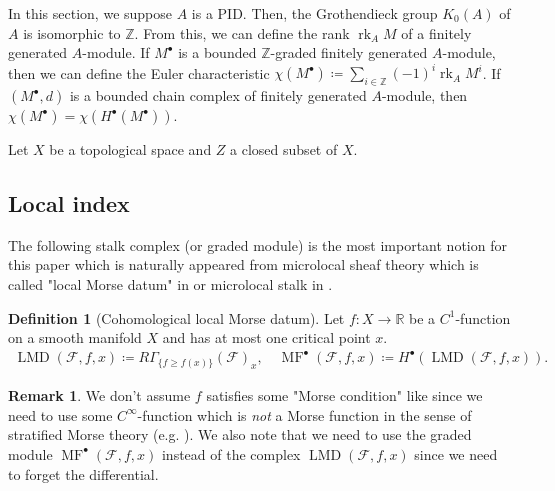\documentclass[a4paper,dvipdfmx,reqno,12pt]{amsart}
\theoremstyle{definition}
\newtheorem{Def}[Thm]{Definition}
\newtheorem{Rmk}[Thm]{Remark}
\newcommand{\deq}{\coloneqq}
\newcommand{\R}{\mathbb{R}}%
\newcommand{\Z}{\mathbb{Z}}%
\newcommand{\mcal}[1]{\mathcal{#1}}%
\newcommand{\opn}[1]{\operatorname{#1}}
\numberwithin{equation}{section}
\begin{document}
In this section, we suppose $A$ is a PID. Then, the Grothendieck 
group $K_0(A)$ of $A$ is isomorphic to $\Z$. From this, 
we can define the rank $\opn{rk}_A M$ of 
a finitely generated $A$-module.
If $M^{\bullet}$ is a bounded $\Z$-graded finitely generated $A$-module,
then we can define the Euler characteristic 
$\chi(M^{\bullet})\deq \sum_{i\in \Z}(-1)^{i}\opn{rk}_A M^{i}$.
If $(M^{\bullet},d)$ is a bounded chain complex of finitely 
generated $A$-module, then 
$\chi(M^{\bullet})=\chi(H^{\bullet}(M^{\bullet}))$.

Let $X$ be a topological space and $Z$ a closed subset of $X$.



\subsection{Local index}

The following stalk complex (or graded module) is 
the most important notion
for this paper which is naturally appeared from 
microlocal sheaf theory 
which is called "local Morse datum" in \cite[p.271]{MR2031639} 
or microlocal stalk in \cite{MR4132582}.
\begin{Def}[{Cohomological local Morse datum}]
Let $f:X\to \R$ be a $C^{1}$-function on a smooth manifold $X$ and has 
at most one critical point $x$.
\begin{align}
\opn{LMD}(\mcal{F},f,x)\deq R\Gamma_{\{f\geq f(x)\}}
(\mcal{F})_x, \quad \opn{MF}^{\bullet}(\mcal{F},f,x)\deq 
H^{\bullet}(\opn{LMD}(\mcal{F},f,x)).
\end{align}
\end{Def}

\begin{Rmk}
We don't assume $f$ satisfies some 
"Morse condition" like \cite{MR2031639,MR4132582} since
 we need to use some $C^{\infty}$-function
which is \emph{not} a Morse function in the sense of 
stratified Morse theory (e.g. \cite[Part 1.2.1]{MR932724}). 
We also note that we need to use 
the graded module $\opn{MF}^{\bullet}(\mcal{F},f,x)$ instead of 
the complex $\opn{LMD}(\mcal{F},f,x)$ since we need to
forget the differential.
\end{Rmk}
\end{document}
